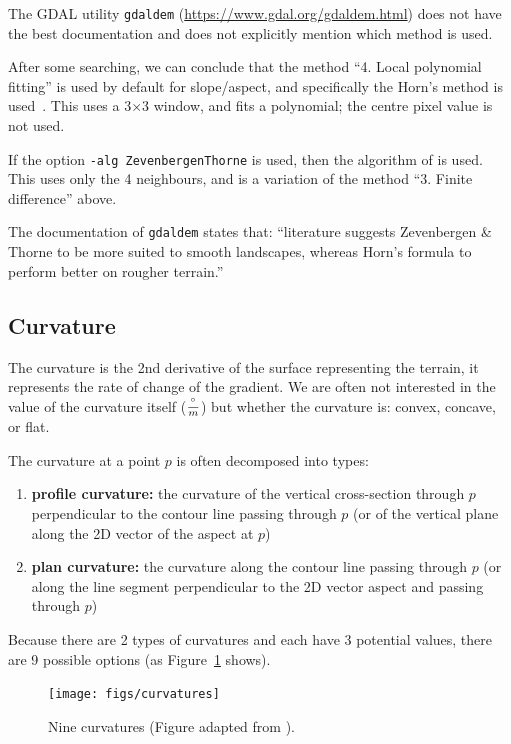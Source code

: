 \begin{floatbox}
  \begin{kaobox-practice}[frametitle=\faCog\ How does it work in practice?]
    The GDAL utility \texttt{gdaldem} (\url{https://www.gdal.org/gdaldem.html}) does not have the best documentation and does not explicitly mention which method is used.

    After some searching, we can conclude that the method ``4. Local polynomial fitting'' is used by default for slope/aspect, and specifically the Horn's method is used~\citep{Horn81}.
    This uses a 3$\times$3 window, and fits a polynomial; the centre pixel value is not used.

    If the option \texttt{-alg ZevenbergenThorne} is used, then the algorithm of \citet{Zevenbergen87} is used. 
    This uses only the 4 neighbours, and is a variation of the method ``3. Finite difference'' above.

    The documentation of \texttt{gdaldem} states that: ``literature suggests Zevenbergen \& Thorne to be more suited to smooth landscapes, whereas Horn's formula to perform better on rougher terrain.''
  \end{kaobox-practice}
\end{floatbox}


%
\subsection{Curvature}%

The curvature is the 2nd derivative of the surface representing the terrain, it represents the rate of change of the gradient.%
We are often not interested in the value of the curvature itself ($\frac{\degree}{m}$) but whether the curvature is: convex, concave, or flat.

The curvature at a point $p$ is often decomposed into types:
\begin{enumerate}
  \item \textbf{profile curvature:} the curvature of the vertical cross-section through $p$ perpendicular to the contour line passing through $p$ (or of the vertical plane along the 2D vector of the aspect at $p$)
  \item \textbf{plan curvature:} the curvature along the contour line passing through $p$ (or along the line segment perpendicular to the 2D vector aspect and passing through $p$)
\end{enumerate} 
Because there are 2 types of curvatures and each have 3 potential values, there are 9 possible options (as Figure~\ref{fig:curvatures} shows).
\begin{figure}
  \centering
  \texttt{[image: figs/curvatures]}
  \caption{Nine curvatures (Figure adapted from \citet{vanKreveld97}).}%
\label{fig:curvatures}
\end{figure}


